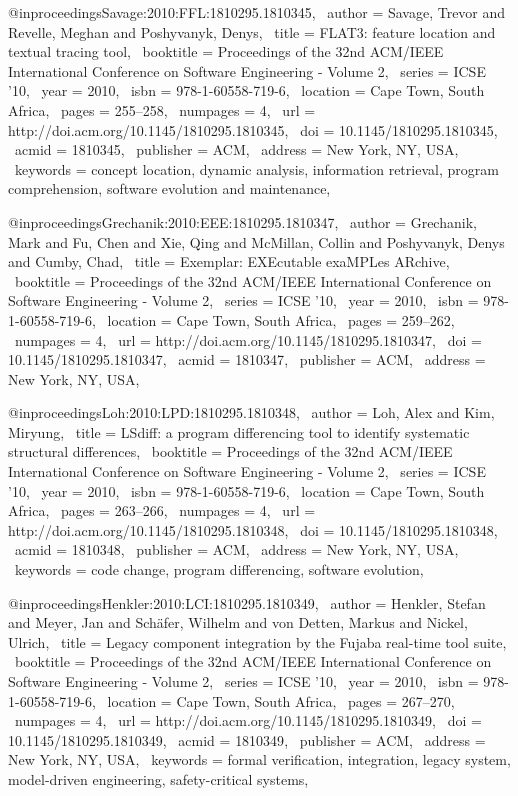 @inproceedings{Savage:2010:FFL:1810295.1810345,
 author = {Savage, Trevor and Revelle, Meghan and Poshyvanyk, Denys},
 title = {FLAT3: feature location and textual tracing tool},
 booktitle = {Proceedings of the 32nd ACM/IEEE International Conference on Software Engineering - Volume 2},
 series = {ICSE '10},
 year = {2010},
 isbn = {978-1-60558-719-6},
 location = {Cape Town, South Africa},
 pages = {255--258},
 numpages = {4},
 url = {http://doi.acm.org/10.1145/1810295.1810345},
 doi = {10.1145/1810295.1810345},
 acmid = {1810345},
 publisher = {ACM},
 address = {New York, NY, USA},
 keywords = {concept location, dynamic analysis, information retrieval, program comprehension, software evolution and maintenance},
} 

@inproceedings{Grechanik:2010:EEE:1810295.1810347,
 author = {Grechanik, Mark and Fu, Chen and Xie, Qing and McMillan, Collin and Poshyvanyk, Denys and Cumby, Chad},
 title = {Exemplar: EXEcutable exaMPLes ARchive},
 booktitle = {Proceedings of the 32nd ACM/IEEE International Conference on Software Engineering - Volume 2},
 series = {ICSE '10},
 year = {2010},
 isbn = {978-1-60558-719-6},
 location = {Cape Town, South Africa},
 pages = {259--262},
 numpages = {4},
 url = {http://doi.acm.org/10.1145/1810295.1810347},
 doi = {10.1145/1810295.1810347},
 acmid = {1810347},
 publisher = {ACM},
 address = {New York, NY, USA},
} 

@inproceedings{Loh:2010:LPD:1810295.1810348,
 author = {Loh, Alex and Kim, Miryung},
 title = {LSdiff: a program differencing tool to identify systematic structural differences},
 booktitle = {Proceedings of the 32nd ACM/IEEE International Conference on Software Engineering - Volume 2},
 series = {ICSE '10},
 year = {2010},
 isbn = {978-1-60558-719-6},
 location = {Cape Town, South Africa},
 pages = {263--266},
 numpages = {4},
 url = {http://doi.acm.org/10.1145/1810295.1810348},
 doi = {10.1145/1810295.1810348},
 acmid = {1810348},
 publisher = {ACM},
 address = {New York, NY, USA},
 keywords = {code change, program differencing, software evolution},
} 

@inproceedings{Henkler:2010:LCI:1810295.1810349,
 author = {Henkler, Stefan and Meyer, Jan and Sch\"{a}fer, Wilhelm and von Detten, Markus and Nickel, Ulrich},
 title = {Legacy component integration by the Fujaba real-time tool suite},
 booktitle = {Proceedings of the 32nd ACM/IEEE International Conference on Software Engineering - Volume 2},
 series = {ICSE '10},
 year = {2010},
 isbn = {978-1-60558-719-6},
 location = {Cape Town, South Africa},
 pages = {267--270},
 numpages = {4},
 url = {http://doi.acm.org/10.1145/1810295.1810349},
 doi = {10.1145/1810295.1810349},
 acmid = {1810349},
 publisher = {ACM},
 address = {New York, NY, USA},
 keywords = {formal verification, integration, legacy system, model-driven engineering, safety-critical systems},
} 

